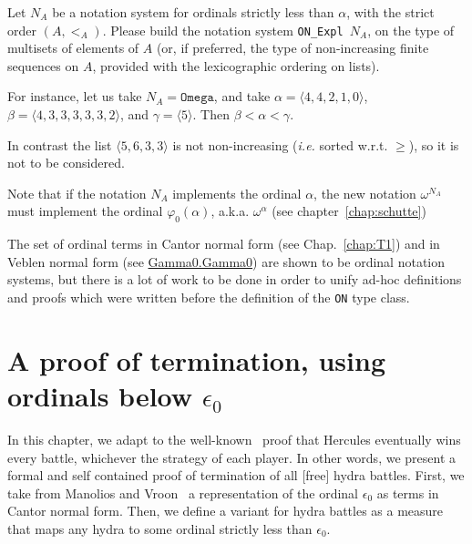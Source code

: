 \documentclass[a4paper]{book}
\begin{document}

\begin{project}
Let $N_A$ be a notation system for ordinals strictly less than $\alpha$, 
with the strict order $(A,<_A)$. Please build the notation system
\texttt{ON\_Expl $N_A$}, on the type of multisets of elements of $A$
(or, if preferred, the type of non-increasing finite sequences on $A$,
provided with the lexicographic ordering on lists).

For instance, let us take $N_A=\texttt{Omega}$, and take $\alpha=\langle 4,4,2,1,0\rangle$,
 $\beta=\langle 4,3,3,3,3,3,2\rangle$, and $\gamma=\langle 5\rangle$. Then $\beta<\alpha<\gamma$. 

In contrast the list $\langle5,6,3,3\rangle$ is not non-increasing (\emph{i.e.} sorted w.r.t. $\geq$), so it is not to be considered.

Note that if the notation $N_A$ implements the ordinal 
$\alpha$,  the new notation $\omega^{N_A}$ must implement the ordinal $\varphi_0(\alpha)$, a.k.a. $\omega^\alpha$ (see chapter~\ref{chap:schutte})

\end{project}



\begin{remark}
 The set of ordinal terms in Cantor normal form (see Chap.~\ref{chap:T1}) and 
in Veblen normal form (see 
\href{../src/html/hydras.Gamma0.Gamma0.html}{Gamma0.Gamma0}) are shown to be ordinal notation systems, but there is a lot of work to be done in order to unify ad-hoc  definitions and proofs which were written before the definition of the \texttt{ON} type class.
\end{remark}











\chapter[A proof of termination, using epsilon0]{A proof of termination, using ordinals below \texorpdfstring{$\epsilon_0$}{epsilon0}}

\label{cnf-math-def}
\label{chap:proof-term}
\label{chap:T1}

In this chapter, we adapt to \coq{} the well-known~\cite{KP82}  proof that Hercules eventually wins every battle, whichever the strategy  of each player.
In other words, we present  a formal and self contained proof of termination  of all [free] hydra battles.
First, we take from Manolios and Vroon~\cite{Manolios2005} a representation of the ordinal $\epsilon_0$ as terms in Cantor normal form. Then, we define a variant for hydra battles as a measure that maps any hydra to some ordinal strictly less than $\epsilon_0$.
\end{document}
